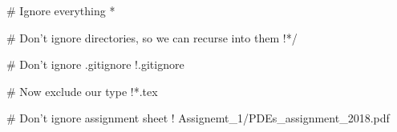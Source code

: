 # Ignore everything
*

# Don't ignore directories, so we can recurse into them
!*/

# Don't ignore .gitignore
!.gitignore

# Now exclude our type
!*.tex

# Don't ignore assignment sheet
! Assignemt_1/PDEs_assignment_2018.pdf